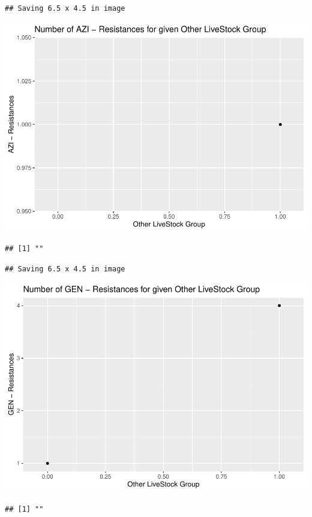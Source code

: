 \documentclass[
]{article}
\begin{document}
\begin{verbatim}
## Saving 6.5 x 4.5 in image
\end{verbatim}

\includegraphics{NResistenzen_files/figure-latex/binary_or_nominal_variables-13.pdf}

\begin{verbatim}
## [1] ""
\end{verbatim}

\begin{verbatim}
## Saving 6.5 x 4.5 in image
\end{verbatim}

\includegraphics{NResistenzen_files/figure-latex/binary_or_nominal_variables-14.pdf}

\begin{verbatim}
## [1] ""
\end{verbatim}
\end{document}
